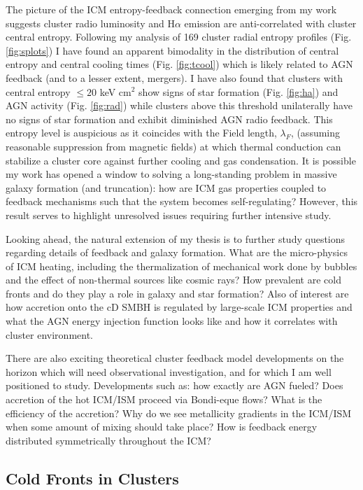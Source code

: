 \documentclass[11pt]{article}
\begin{document}
The picture of the ICM entropy-feedback connection emerging from my
work suggests cluster radio luminosity and H$\alpha$ emission are
anti-correlated with cluster central entropy. Following my analysis of 169
cluster radial entropy profiles (Fig. \ref{fig:splots}) I have found
an apparent bimodality in the distribution of central
entropy and central cooling times (Fig. \ref{fig:tcool}) which is
likely related to AGN feedback (and to a lesser extent, mergers). I
have also found that clusters with central entropy $\leq 20$ keV
cm$^2$ show signs of star formation (Fig. \ref{fig:ha}) and AGN
activity (Fig. \ref{fig:rad}) while clusters above this threshold
unilaterally have no signs of star formation and exhibit diminished AGN
radio feedback. This entropy level is auspicious as it coincides with
the Field length, $\lambda_F$, (assuming reasonable suppression from
magnetic fields) at which thermal conduction can stabilize a cluster
core against further cooling and gas condensation. It is possible my
work has opened a window to solving a long-standing problem in massive
galaxy formation (and truncation): how are ICM gas properties coupled
to feedback mechanisms such that the system becomes self-regulating?
However, this result serves to highlight unresolved issues requiring
further intensive study.

Looking ahead, the natural extension of my thesis is to further study
questions regarding details of feedback and galaxy formation. What are
the micro-physics of ICM heating, including the thermalization of
mechanical work done by bubbles and the effect of non-thermal sources
like cosmic rays? How prevalent are cold fronts and do they play a
role in galaxy and star formation? Also of interest are how accretion
onto the cD SMBH is regulated by large-scale ICM properties and what
the AGN energy injection function looks like and how it correlates
with cluster environment.

There are also exciting theoretical cluster feedback model
developments on the horizon which will need observational
investigation, and for which I am well positioned to
study. Developments such as: how exactly are AGN fueled? Does
accretion of the hot ICM/ISM proceed via Bondi-eque flows? What is the
efficiency of the accretion? Why do we see metallicity gradients in
the ICM/ISM when some amount of mixing should take place? How is
feedback energy distributed symmetrically throughout the ICM?

\subsection*{Cold Fronts in Clusters}
\end{document}
